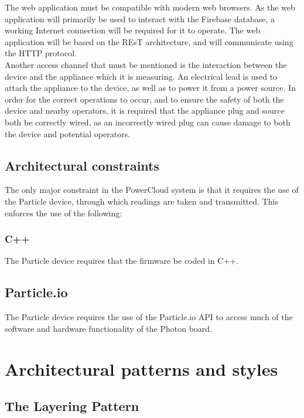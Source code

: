 \documentclass{article}
\begin{document}
	The web application must be compatible with modern web browsers. As 
	the web application will primarily be used to interact with the 
	Firebase database, a working Internet connection will be required for 
	it to operate. The web application will be based on the REsT 
	architecture, and will communicate using the HTTP protocol.\\
	
	Another access channel that must be mentioned is the interaction 
	between the device and the appliance which it is measuring. An 
	electrical lead is used to attach the appliance to the device, as 
	well as to power it from a power source. In order for the correct 
	operations to occur, and to ensure the safety of both the device and 
	nearby operators, it is required that the appliance plug and source 
	both be correctly wired, as an incorrectly wired plug can cause 
	damage to both the device and potential operators.
	
	\subsection{Architectural constraints}
	
	The only major constraint in the PowerCloud system is that it 
	requires the use of the Particle device, through which readings are 
	taken and transmitted. This enforces the use of the following:\\
	
	\subsubsection{C++}
	The Particle device requires that the firmware be coded in C++.\\
	
	\subsection{Particle.io}
	The Particle device requires the use of the Particle.io API to access 
	much of the software and hardware functionality of the Photon board.

\newpage

\section{Architectural patterns and styles}

	\subsection{The Layering Pattern}
	
\end{document}
